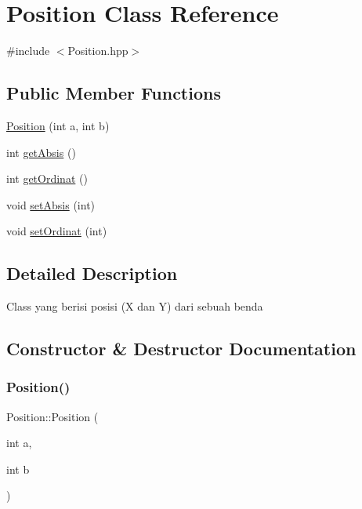 \hypertarget{class_position}{}\section{Position Class Reference}
\label{class_position}


{\ttfamily \#include $<$Position.\+hpp$>$}

\subsection*{Public Member Functions}
\begin{DoxyCompactItemize}
\item 
\mbox{\hyperlink{class_position_aba25a7ca9f5da20fdac7b2a201810b17}{Position}} (int a, int b)
\item 
int \mbox{\hyperlink{class_position_ae0b87342402a20f3ea98d4358619c110}{get\+Absis}} ()
\item 
int \mbox{\hyperlink{class_position_a7a6338c4b0f28195ff2c5a975b9514b2}{get\+Ordinat}} ()
\item 
void \mbox{\hyperlink{class_position_a0e0d7c4dc5bb161361461f10e0a9c8e0}{set\+Absis}} (int)
\item 
void \mbox{\hyperlink{class_position_af45a9ea26ffa9a02f8f06c7fa4c7285e}{set\+Ordinat}} (int)
\end{DoxyCompactItemize}


\subsection{Detailed Description}
Class yang berisi posisi (X dan Y) dari sebuah benda 

\subsection{Constructor \& Destructor Documentation}
\mbox{\label{class_position_aba25a7ca9f5da20fdac7b2a201810b17}} 
\subsubsection{\texorpdfstring{Position()}{Position()}}
{\footnotesize\ttfamily Position\+::\+Position (\begin{DoxyParamCaption}\item[{int}]{a,  }\item[{int}]{b }\end{DoxyParamCaption})}

